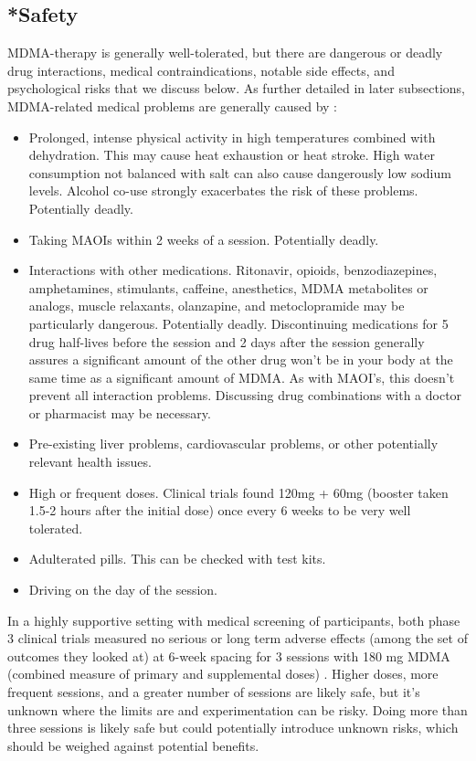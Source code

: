 \documentclass[12pt,letterpaper]{article}
\begin{document}
\subsection{*Safety}
\label{sectionSafety}
MDMA-therapy is generally well-tolerated, but there are dangerous or deadly drug interactions, medical contraindications, notable side effects, and psychological risks that we discuss below. As further detailed in later subsections, MDMA-related medical problems are generally caused by \cite{riggDeaths,roxburghDeaths}:
\begin{itemize}
    \item Prolonged, intense physical activity in high temperatures combined with dehydration. This may cause heat exhaustion or heat stroke. High water consumption not balanced with salt can also cause dangerously low sodium levels. Alcohol co-use strongly exacerbates the risk of these problems. Potentially deadly.
    \item Taking MAOIs within 2 weeks of a session. Potentially deadly.
    \item Interactions with other medications. Ritonavir, opioids, benzodiazepines, amphetamines, stimulants, caffeine, anesthetics, MDMA metabolites or analogs, muscle relaxants, olanzapine, and metoclopramide may be particularly dangerous. Potentially deadly. Discontinuing medications for 5 drug half-lives before the session and 2 days after the session generally assures a significant amount of the other drug won't be in your body at the same time as a significant amount of MDMA. As with MAOI's, this doesn't prevent all interaction problems. Discussing drug combinations with a doctor or pharmacist may be necessary.
    \item Pre-existing liver problems, cardiovascular problems, or other potentially relevant health issues.
    \item High or frequent doses. Clinical trials found 120mg + 60mg (booster taken 1.5-2 hours after the initial dose) once every 6 weeks to be very well tolerated.
    \item Adulterated pills. This can be checked with test kits.
    \item Driving on the day of the session.
\end{itemize}

In a highly supportive setting with medical screening of participants, both phase 3 clinical trials measured no serious or long term adverse effects (among the set of outcomes they looked at) at 6-week spacing for 3 sessions with 180 mg MDMA (combined measure of primary and supplemental doses) \cite{mitchellMDMAClinicalTrial,mitchellMDMAClinicalTrial2}. Higher doses, more frequent sessions, and a greater number of sessions are likely safe, but it's unknown where the limits are and experimentation can be risky. Doing more than three sessions is likely safe but could potentially introduce unknown risks, which should be weighed against potential benefits.
\end{document}
